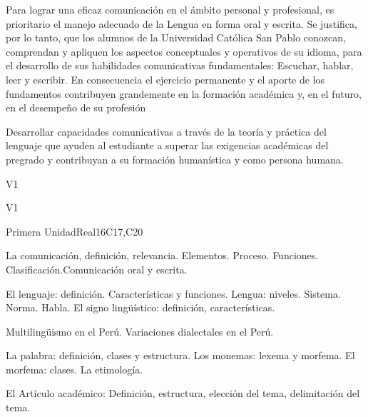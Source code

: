 \begin{syllabus}


\begin{justification}
Para lograr una eficaz comunicación en el ámbito personal y profesional, es prioritario el manejo adecuado de la Lengua en forma oral y escrita. Se justifica, por lo tanto, que los alumnos de la Universidad Católica San Pablo conozcan, comprendan y apliquen los aspectos conceptuales y operativos de su idioma, para el desarrollo de sus habilidades comunicativas fundamentales: Escuchar, hablar, leer y escribir.
En consecuencia el ejercicio permanente y el aporte de los fundamentos contribuyen grandemente en la formación académica y, en el futuro, en el desempeño de su profesión
\end{justification}

\begin{goals}
\item Desarrollar capacidades comunicativas a través de la teoría y práctica del lenguaje que ayuden al estudiante a superar las exigencias académicas del pregrado y contribuyan a su formación humanística y como persona humana.
\end{goals}

\begin{outcomes}{V1}
   \item {}
   \item {}
   \item {}
\end{outcomes}

\begin{competences}{V1}
    \item {}
    \item {}
    \item {}
\end{competences}

\begin{unit}{Primera Unidad}{}{Real}{16}{C17,C20}
\begin{topics}
      \item La comunicación, definición, relevancia. Elementos. Proceso. Funciones. Clasificación.Comunicación oral y escrita.
      \item El lenguaje: definición. Características y funciones. Lengua: niveles. Sistema. Norma. Habla. El signo lingüístico: definición, características.
      \item Multilingüismo en el Perú. Variaciones dialectales en el Perú.
      \item La palabra: definición, clases y estructura. Los monemas: lexema y morfema. El morfema: clases. La etimología.
      \item El Artículo académico: Definición, estructura, elección del tema, delimitación del tema.
\end{topics}


\end{unit}
\end{syllabus}
